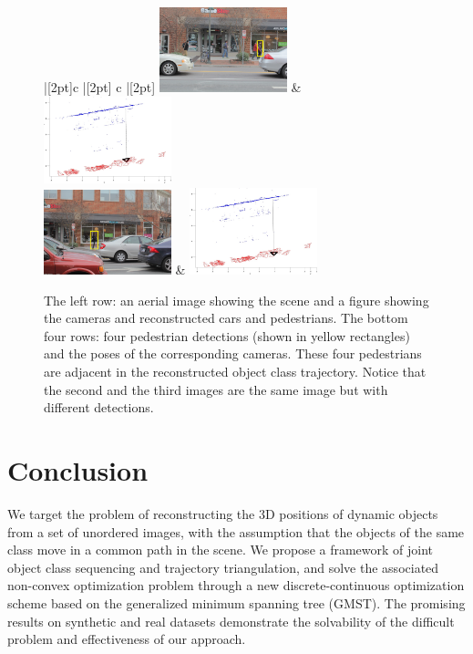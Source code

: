 \begin{figure}
\begin{tabu}{ |[2pt]c |[2pt] c |[2pt]}
\tabucline[2pt]{-}
\includegraphics[width=0.33\textwidth]{chapter4/resource/cleanFrame085.jpg} & 
\includegraphics[width=0.33\textwidth]{chapter4/resource/Frame_085_crop.jpg} \\
\tabucline[2pt]{-}
\includegraphics[width=0.33\textwidth]{chapter4/resource/cleanFrame086.jpg} &
\includegraphics[width=0.33\textwidth]{chapter4/resource/Frame_086_crop.jpg}\\
\tabucline[2pt]{-}
\end{tabu}
\caption{The left row: an aerial image showing the scene and a figure showing the cameras and reconstructed cars and pedestrians. The bottom four rows: four pedestrian detections (shown in yellow rectangles) and the poses of the corresponding cameras. These four pedestrians are adjacent in the reconstructed object class trajectory. Notice that the second and the third images are the same image but with different detections.}
\label{fig:franklin_Recon}
\end{figure}

\section{Conclusion}
We target the problem of reconstructing the 3D positions of dynamic objects from a set of unordered images, with the assumption that the objects of the same class move in a common path in the scene. 
We propose a framework of joint object class sequencing and trajectory triangulation, and solve the associated non-convex optimization problem through a new discrete-continuous optimization scheme based on the generalized minimum spanning tree (GMST).
The promising results on synthetic and real datasets demonstrate the solvability of the difficult problem and effectiveness of our approach.

